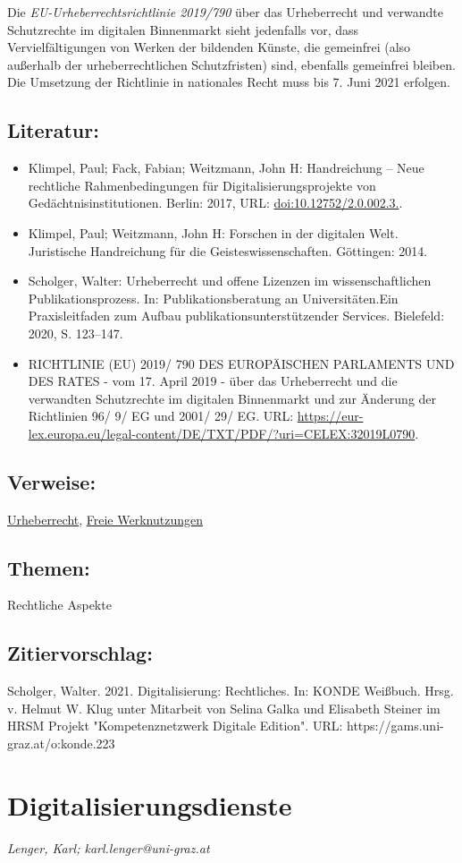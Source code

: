 \documentclass{article}
\begin{document}
        Die \emph{EU-Urheberrechtsrichtlinie 2019/790} über das Urheberrecht und verwandte Schutzrechte im digitalen Binnenmarkt sieht jedenfalls vor, dass Vervielfältigungen von Werken der bildenden Künste, die gemeinfrei (also außerhalb der urheberrechtlichen Schutzfristen) sind, ebenfalls gemeinfrei bleiben. Die Umsetzung der Richtlinie in nationales Recht muss bis 7. Juni 2021 erfolgen.\\
            
        \subsection*{Literatur:}\begin{itemize}\item Klimpel, Paul; Fack, Fabian; Weitzmann, John H: Handreichung  – Neue rechtliche Rahmenbedingungen für Digitalisierungsprojekte von Gedächtnisinstitutionen. Berlin: 2017, URL: \url{doi:10.12752/2.0.002.3.}.\item Klimpel, Paul; Weitzmann, John H: Forschen in der digitalen Welt. Juristische Handreichung für die Geisteswissenschaften. Göttingen: 2014.\item Scholger, Walter: Urheberrecht und offene Lizenzen im wissenschaftlichen Publikationsprozess. In: Publikationsberatung an Universitäten.Ein Praxisleitfaden zum Aufbau publikationsunterstützender Services. Bielefeld: 2020, S. 123–147.\item RICHTLINIE  (EU)  2019/  790  DES  EUROPÄISCHEN  PARLAMENTS  UND  DES  RATES  -  vom  17. April  2019  -  über  das  Urheberrecht  und  die  verwandten  Schutzrechte  im  digitalen  Binnenmarkt  und  zur  Änderung  der  Richtlinien  96/  9/  EG  und  2001/  29/  EG. URL: \url{https://eur-lex.europa.eu/legal-content/DE/TXT/PDF/?uri=CELEX:32019L0790}.\end{itemize}\subsection*{Verweise:}\href{https://gams.uni-graz.at/o:konde.44}{Urheberrecht}, \href{https://gams.uni-graz.at/o:konde.222}{Freie Werknutzungen}\subsection*{Themen:}Rechtliche Aspekte\subsection*{Zitiervorschlag:}Scholger, Walter. 2021. Digitalisierung: Rechtliches. In: KONDE Weißbuch. Hrsg. v. Helmut W. Klug unter Mitarbeit von Selina Galka und Elisabeth Steiner im HRSM Projekt "Kompetenznetzwerk Digitale Edition". URL: https://gams.uni-graz.at/o:konde.223\newpage\section*{Digitalisierungsdienste} \emph{Lenger, Karl; karl.lenger@uni-graz.at }\\
        
\end{document}
